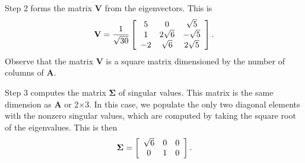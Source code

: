 Step 2 forms the matrix $\mathbf{V}$ from the eigenvectors. This is
\begin{align}
  \mathbf{V} = \frac{1}{\sqrt{30}} \left[ \begin{array}{c c c}
   5 &  0 			&   \sqrt{5} \\
   1 &  2\sqrt{6} 	&  -\sqrt{5} \\
  -2 &   \sqrt{6} 	&  2\sqrt{5} \\ \end{array} \right] .
\end{align}
Observe that the matrix $\mathbf{V}$ is a square matrix dimensioned by the number of columns of $\mathbf{A}$.

Step 3 computes the matrix $\boldsymbol\Sigma$ of singular values. This matrix is the same dimension as $\mathbf{A}$ or 2$\times$3. In this case, we populate the only two diagonal elements with the nonzero singular values, which are computed by taking the square root of the eigenvalues. This is then
\begin{align}
  \boldsymbol\Sigma = \left[ \begin{array}{c c c}
  \sqrt{6}	& 0		& 0		\\
  0			& 1		& 0		\\ \end{array} \right] .
\end{align}

